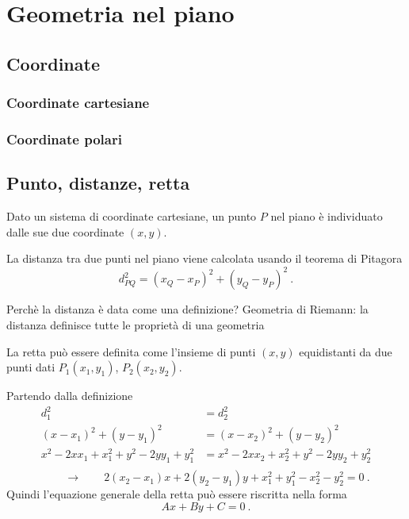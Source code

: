 \section{Geometria nel piano}
\subsection{Coordinate}
\subsubsection{Coordinate cartesiane}
\subsubsection{Coordinate polari}
\subsection{Punto, distanze, retta}
\begin{definition}[Punto]
Dato un sistema di coordinate cartesiane, un punto $P$ nel piano è individuato dalle sue due coordinate $(x,y)$.
\end{definition}
\begin{definition}
La distanza tra due punti nel piano viene calcolata usando il teorema di Pitagora
\begin{equation}
    d_{PQ}^2 = (x_Q - x_P)^2 + (y_Q - y_P)^2 \ .
\end{equation}
\end{definition}
{\color{red} Perchè la distanza è data come una definizione? Geometria di Riemann: la distanza definisce tutte le proprietà di una geometria}

\begin{definition}[Retta]
    La retta può essere definita come l'insieme di punti $(x,y)$ equidistanti da due punti dati $P_1(x_1,y_1)$, $P_2(x_2,y_2)$.
\end{definition}
Partendo dalla definizione
\begin{equation}
\begin{aligned}
    d_1^2 & = d_2^2 \\
    (x - x_1)^2 + (y-y_1)^2 & = (x - x_2)^2 + (y-y_2)^2 \\
    x^2 - 2 x x_1 + x_1^2 + y^2 - 2 y y_1 + y_1^2 & = x^2 - 2 x x_2 + x_2^2 + y^2 - 2 y y_2 + y_2^2 \\
\end{aligned}
\end{equation}
\begin{equation}
  \qquad \rightarrow \qquad 2(x_2 - x_1) x + 2(y_2 - y_1) y + x_1^2 + y_1^2 - x_2^2 - y_2^2 = 0 \ .
\end{equation}
Quindi l'equazione generale della retta può essere riscritta nella forma
\begin{equation}
    A x + B y + C = 0 \ .
\end{equation}

